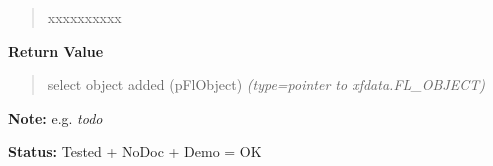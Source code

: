 \begin{boxedminipage}{\funcwidth}
\begin{quote}
\begin{Ventry}{xxxxxxxxxx}
        \end{Ventry}

      \end{quote}

      \textbf{Return Value}
    \vspace{-1ex}

      \begin{quote}

select object added (pFlObject)
      {\it (type=pointer to xfdata.FL\_OBJECT)}

      \end{quote}

\textbf{Note:} 
e.g. \emph{todo}


\textbf{Status:} 
Tested + NoDoc + Demo = OK


    \end{boxedminipage}

    \label{xformslib:flselect:fl_clear_select}

    \vspace{0.5ex}

